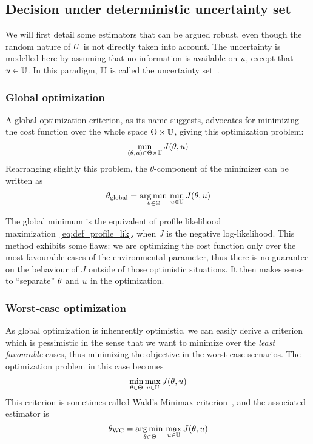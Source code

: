 \documentclass[../../Main_ManuscritThese.tex]{subfiles}
\begin{document}
\subsection{Decision under deterministic uncertainty set}
We will first detail some estimators that can be argued robust, even though the random nature of $U$ is not directly taken into account.
The uncertainty is modelled here by assuming that no information is available on $u$, except that $u \in \mathbb{U}$. In this paradigm, $\mathbb{U}$ is called the uncertainty set~\cite{bertsimas_theory_2010}.

\subsubsection{Global optimization}
A global optimization criterion, as its name suggests, advocates for minimizing the cost function over the whole space $\Theta \times \mathbb{U}$, giving this optimization problem:
\begin{equation}
  \min_{(\theta,u) \in \Theta \times \mathbb{U}} J(\theta, u)
\end{equation}
Rearranging slightly this problem, the $\theta$-component of the minimizer can be written as
\begin{equation}
  \label{eq:kkglobal}
  {\theta}_{\mathrm{global}} = \operatorname*{arg\,min \,}_{\theta \in \Theta} \min_{u \in \mathbb{U}} J(\theta, u)
\end{equation}

The global minimum is the equivalent of profile likelihood
maximization~\cref{eq:def_profile_lik}, when $J$ is the negative
log-likelihood. This method exhibits some flaws: we are optimizing the
cost function only over the most favourable cases of the environmental
parameter, thus there is no guarantee on the behaviour of $J$ outside
of those optimistic situations.  It then makes sense to ``separate''
$\theta$ and $u$ in the optimization.

\subsubsection{Worst-case optimization}
\label{sec:saddle_point}
As global optimization is inhenrently optimistic, we can easily derive
a criterion which is pessimistic in the sense that we want to minimize
over the \emph{least favourable} cases, thus minimizing the objective
in the worst-case scenarios. The optimization problem in this case
becomes
\begin{equation}
  \min_{\theta\in\Theta} \max_{u \in \mathbb{U}} J(\theta,u)
\end{equation}
This criterion is sometimes called Wald's Minimax criterion~\cite{wald_statistical_1945}, and the associated estimator is
\begin{equation}
  \label{eq:kkwc}
  {\theta}_{\mathrm{WC}} =  \operatorname*{arg\,min \,}_{\theta \in \Theta} \max_{u \in \mathbb{U}} J(\theta, u)
\end{equation}
\end{document}
